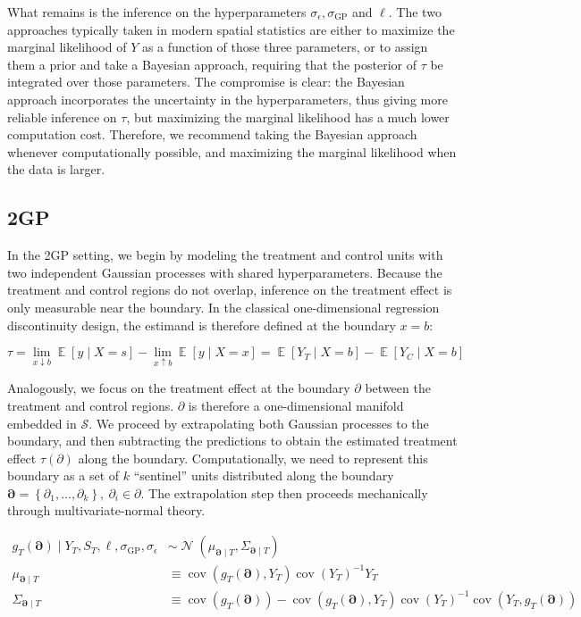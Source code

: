 \documentclass[letter]{article}
\newcommand{\genericdel}[3]{%
      \left#1#3\right#2
    }
\newcommand{\del}[1]{\genericdel(){#1}}
\newcommand{\sbr}[1]{\genericdel[]{#1}}
\newcommand{\cbr}[1]{\genericdel\{\}{#1}}
\DeclareMathOperator{\E}{\mathbb{E}}
\DeclareMathOperator{\cov}{{cov}}
\DeclareMathOperator{\normal}{\mathcal{N}}
\newcommand{\scrS}{\mathscr{S}}
\newcommand{\sigmaf}{\sigma_{\mathrm{GP}}}
\newcommand{\sigman}{\sigma_{\epsilon}}
\newcommand{\boundary}{\partial}
\newcommand{\sentinels}{\bm{\boundary}}
\begin{document}
What remains is the inference on the hyperparameters \(\sigman, \sigmaf\) and \(\ell\). The two approaches typically taken in modern spatial statistics are either to maximize the marginal likelihood of \(Y\) as a function of those three parameters, or to assign them a prior and take a Bayesian approach, requiring that the posterior of \(\tau\) be integrated over those parameters. The compromise is clear: the Bayesian approach incorporates the uncertainty in the hyperparameters, thus giving more reliable inference on \(\tau\), but maximizing the marginal likelihood has a much lower computation cost. Therefore, we recommend taking the Bayesian approach whenever computationally possible, and maximizing the marginal likelihood when the data is larger.
    


    	\subsection{2GP}\label{gp}

In the 2GP setting, we begin by modeling the treatment and control units with two independent Gaussian processes with shared hyperparameters. Because the treatment and control regions do not overlap, inference on the treatment effect is only measurable near the boundary. In the classical one-dimensional regression discontinuity design, the estimand is therefore defined at the boundary \(x=b\):

\begin{equation}
\tau = \lim_{x \downarrow b} \E\sbr{y \mid X=s} - \lim_{x \uparrow b} \E\sbr{y \mid X=x} = \E\sbr{Y_T \mid X=b} - \E\sbr{Y_C \mid X=b}
\end{equation}

Analogously, we focus on the treatment effect at the boundary \(\boundary\) between the treatment and control regions. \(\boundary\) is therefore a one-dimensional manifold embedded in \(\scrS\).
We proceed by extrapolating both Gaussian processes to the boundary,
and then subtracting the predictions to obtain the estimated treatment effect \(\tau(\boundary)\) along the boundary.
Computationally, we need to represent this boundary as a set of \(k\) ``sentinel'' units distributed along the boundary \(\sentinels=\cbr{\boundary_1,\ldots,\boundary_k},~\partial_i \in \partial\).
The extrapolation step then proceeds mechanically through multivariate-normal theory.

\begin{equation}\begin{split}
    g_T(\sentinels) \mid Y_T, S_T, \ell, \sigmaf, \sigman &\sim \normal\del{\mu_{\sentinels \mid T}, \Sigma_{\sentinels \mid T}} \\
    \mu_{\sentinels \mid T} &\equiv \cov\del{g_T(\sentinels), Y_T} \cov\del{Y_T}^{-1}  Y_T \\
    \Sigma_{\sentinels \mid T} &\equiv \cov \del{g_T(\sentinels)} - \cov\del{g_T(\sentinels), Y_T} \cov\del{Y_T}^{-1} \cov\del{Y_T,g_T(\sentinels) \label{eq:postvarT2gp}
    }
\end{split}\end{equation}
\end{document}
